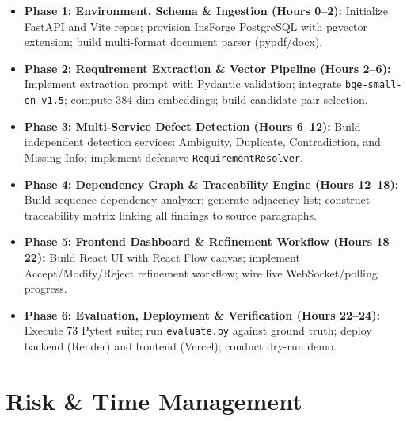 \documentclass[11pt,a4paper]{article}
\begin{document}
\begin{itemize}
  \item \textbf{Phase 1: Environment, Schema \& Ingestion (Hours 0--2):} Initialize FastAPI and Vite repos; provision InsForge PostgreSQL with pgvector extension; build multi-format document parser (pypdf/docx).
  \item \textbf{Phase 2: Requirement Extraction \& Vector Pipeline (Hours 2--6):} Implement extraction prompt with Pydantic validation; integrate \texttt{bge-small-en-v1.5}; compute 384-dim embeddings; build candidate pair selection.
  \item \textbf{Phase 3: Multi-Service Defect Detection (Hours 6--12):} Build independent detection services: Ambiguity, Duplicate, Contradiction, and Missing Info; implement defensive \texttt{RequirementResolver}.
  \item \textbf{Phase 4: Dependency Graph \& Traceability Engine (Hours 12--18):} Build sequence dependency analyzer; generate adjacency list; construct traceability matrix linking all findings to source paragraphs.
  \item \textbf{Phase 5: Frontend Dashboard \& Refinement Workflow (Hours 18--22):} Build React UI with React Flow canvas; implement Accept/Modify/Reject refinement workflow; wire live WebSocket/polling progress.
  \item \textbf{Phase 6: Evaluation, Deployment \& Verification (Hours 22--24):} Execute 73 Pytest suite; run \texttt{evaluate.py} against ground truth; deploy backend (Render) and frontend (Vercel); conduct dry-run demo.
\end{itemize}

\section{Risk \& Time Management}
\end{document}
